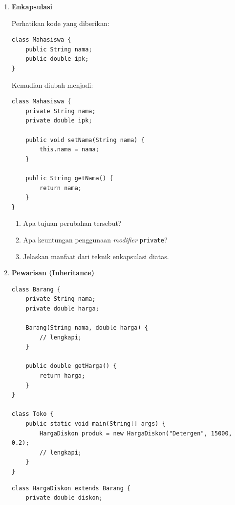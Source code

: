 \documentclass[11pt]{article}
\begin{document}
\begin{enumerate}
  \item \textbf{Enkapsulasi}

        Perhatikan kode yang diberikan:

        \begin{verbatim}
class Mahasiswa {
    public String nama;
    public double ipk;
}
  \end{verbatim}

        Kemudian diubah menjadi:

        \begin{verbatim}
class Mahasiswa {
    private String nama;
    private double ipk;

    public void setNama(String nama) {
        this.nama = nama;
    }

    public String getNama() {
        return nama;
    }
}
  \end{verbatim}

        \begin{enumerate}[label=\alph*)]
          \item Apa tujuan perubahan tersebut?
          \item Apa keuntungan penggunaan \textit{modifier} \texttt{private}?
          \item Jelaskan manfaat dari teknik enkapsulasi diatas.
        \end{enumerate}

  \item \textbf{Pewarisan (Inheritance)}

        \begin{center}
          \begin{minipage}{0.47\textwidth}
            \begin{verbatim}
class Barang {
    private String nama;
    private double harga;

    Barang(String nama, double harga) {
        // lengkapi;
    }

    public double getHarga() {
        return harga;
    }
}

class Toko {
    public static void main(String[] args) {
        HargaDiskon produk = new HargaDiskon("Detergen", 15000, 0.2);
        // lengkapi;
    }
}
  \end{verbatim}
          \end{minipage}
          \hfill
          \begin{minipage}{0.47\textwidth}
            \begin{verbatim}
class HargaDiskon extends Barang {
    private double diskon;


\end{verbatim}
\end{minipage}
\end{center}
\end{enumerate}
\end{document}
